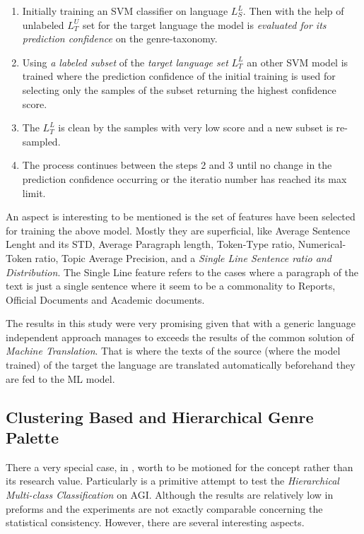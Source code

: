 \begin{enumerate}
\item Initially training an SVM classifier on language $L^{L}_{S}$. Then with the help of unlabeled $L^{U}_{T}$ set for the target language the model is \textit{evaluated for its prediction confidence} on the genre-taxonomy.
\item Using \textit{a labeled subset} of the \textit{target language set} $L^{L}_{T}$ an other SVM model is trained where the {prediction confidence} of the initial training is used for selecting only the samples of the subset returning the highest confidence score. 
\item The $L^{L}_{T}$  is clean by the samples with very low score and a new subset is re-sampled.
\item The process continues between the steps 2 and 3 until no change in the {prediction confidence} occurring or the iteratio number has reached its max limit.
\end{enumerate}

An aspect is interesting to be mentioned is the set of features have been selected for training the above model. Mostly they are superficial, like Average Sentence Lenght and its STD, Average Paragraph length, Token-Type ratio, Numerical-Token ratio, Topic Average Precision, and a \textit{Single Line Sentence ratio and Distribution}. The Single Line feature refers to the cases where a paragraph of the text is just a single sentence where it seem to be a commonality to Reports, Official Documents and Academic documents.

The results in this study were very promising given that with a generic language independent approach manages to exceeds the results of the common solution of \textit{Machine Translation}. That is where the texts of the  source (where the model trained) of the target the language are translated automatically beforehand they are fed to the ML model.

\subsection{Clustering Based and Hierarchical Genre Palette} 

There a very special case, in \parencite{madjarov2015web}, worth to be motioned for the concept rather than its research value. Particularly is a primitive attempt to test the \textit{Hierarchical Multi-class Classification} on AGI. Although the results are relatively low in preforms and the experiments are not exactly comparable concerning the statistical consistency. However, there are several interesting aspects.

